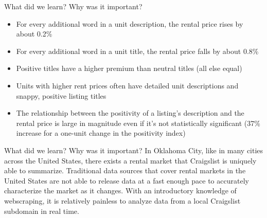 \documentclass{beamer}
\begin{document}
\begin{frame}{What did we learn? Why was it important? }
    \begin{itemize}
        \item For every additional word in a unit description, the rental price rises by about 0.2\%
        \item For every additional word in a unit title, the rental price falls by about 0.8\%
        \item Positive titles have a higher premium than neutral titles (all else equal) 
        \item Units with higher rent prices often have detailed unit descriptions and snappy, positive listing titles
        \item The relationship between the positivity of a listing's description and the rental price is large in magnitude even if it's not statistically significant (37\% increase for a one-unit change in the positivity index)
       \end{itemize}
\end{frame}

\begin{frame}{What did we learn? Why was it important? }
In Oklahoma City, like in many cities across the United States, there exists a rental market that Craigslist is uniquely able to summarize. Traditional data sources that cover rental markets in the United States are not able to release data at a fast enough pace to accurately characterize the market as it changes. With an introductory knowledge of webscraping, it is relatively painless to analyze data from a local Craigslist subdomain in real time. 
\end{frame}
\end{document}

